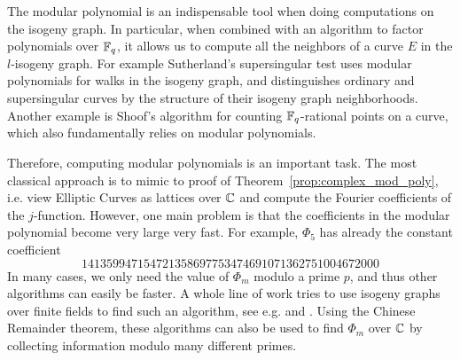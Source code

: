 The modular polynomial is an indispensable tool when doing computations on the isogeny graph.
In particular, when combined with an algorithm to factor polynomials over $\mathbb{F}_q$, it allows us to compute all the neighbors of a curve $E$ in the $l$-isogeny graph.
For example Sutherland's supersingular test \cite{sutherland_supersingularity_test} uses modular polynomials for walks in the isogeny graph, and distinguishes ordinary and supersingular curves by the structure of their isogeny graph neighborhoods.
Another example is Shoof's algorithm \cite{shoof_point_counting} for counting $\mathbb{F}_q$-rational points on a curve, which also fundamentally relies on modular polynomials.

Therefore, computing modular polynomials is an important task.
The most classical approach is to mimic to proof of Theorem~\ref{prop:complex_mod_poly}, i.e. view Elliptic Curves as lattices over $\mathbb{C}$ and compute the Fourier coefficients of the $j$-function.
However, one main problem is that the coefficients in the modular polynomial become very large very fast.
For example, $\Phi_5$ has already the constant coefficient
\begin{equation*}
    141359947154721358697753474691071362751004672000
\end{equation*}
In many cases, we only need the value of $\Phi_m$ modulo a prime $p$, and thus other algorithms can easily be faster.
A whole line of work tries to use isogeny graphs over finite fields to find such an algorithm, see e.g. \cite{compute_modular_polynomial} and \cite{compute_modular_polynomial2}.
Using the Chinese Remainder theorem, these algorithms can also be used to find $\Phi_m$ over $\mathbb{C}$ by collecting information modulo many different primes.
